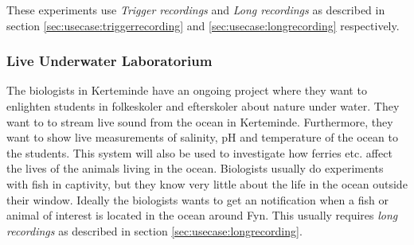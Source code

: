 These experiments use \textit{Trigger recordings} and \textit{Long recordings} as described in section \ref{sec:usecase:triggerrecording} and \ref{sec:usecase:longrecording} respectively.

\subsubsection{Live Underwater Laboratorium}
The biologists in Kerteminde have an ongoing project where they want to enlighten students in folkeskoler and efterskoler about nature under water. They want to to stream live sound from the ocean in Kerteminde. Furthermore, they want to show live measurements of salinity, pH and temperature of the ocean to the students.
This system will also be used to investigate how ferries etc. affect the lives of the animals living in the ocean. Biologists usually do experiments with fish in captivity, but they know very little about the life in the ocean outside their window. Ideally the biologists wants to get an notification when a fish or animal of interest is located in the ocean around Fyn. This usually requires \textit{long recordings} as described in section \ref{sec:usecase:longrecording}.


